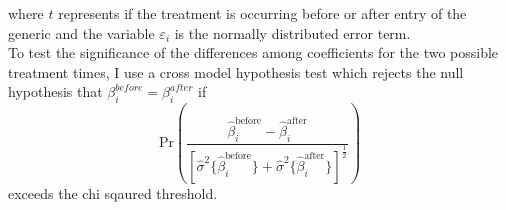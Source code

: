 where $t$ represents if the treatment is occurring before or after entry of the generic and the variable $\varepsilon_i$ is the normally distributed error term.\\
\indent To test the significance of the differences among coefficients for the two possible treatment times, I use a cross model hypothesis test which rejects the null hypothesis that $\beta_i^{before} = \beta_i^{after}$ if 
\begin{equation}
\text{Pr}(\frac{\hat{\beta}^\text{before}_i - \hat{\beta}^\text{after}_i}{[\hat{\sigma}^2\{\hat{\beta}^\text{before}_i\} + \hat{\sigma}^2\{\hat{\beta}^\text{after}_i\}]^\frac{1}{2}})
\end{equation}
exceeds the chi sqaured threshold.\\